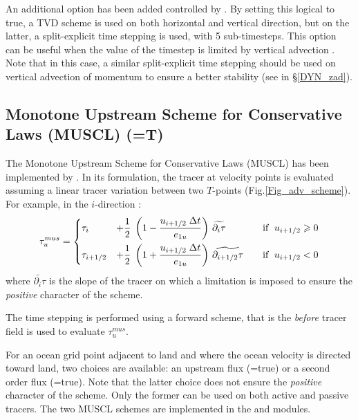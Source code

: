 \documentclass[NEMO_book]{subfiles}
\begin{document}
An additional option has been added controlled by . 
By setting this logical to true, a TVD scheme is used on both horizontal and vertical direction, 
but on the latter, a split-explicit time stepping is used, with 5 sub-timesteps. 
This option can be useful when the value of the timestep is limited by vertical advection \citep{Lemarie_OM2015}. 
Note that in this case, a similar split-explicit time stepping should be used on 
vertical advection of momentum to ensure a better stability (see  in \S\ref{DYN_zad}).


\subsection[MUSCL scheme  (\np{ln\_traadv\_muscl})]
	{Monotone Upstream Scheme for Conservative Laws (MUSCL) (=T)}
\label{TRA_adv_muscl}

The Monotone Upstream Scheme for Conservative Laws (MUSCL) has been 
implemented by \citet{Levy_al_GRL01}. In its formulation, the tracer at velocity points 
is evaluated assuming a linear tracer variation between two $T$-points 
(Fig.\ref{Fig_adv_scheme}). For example, in the $i$-direction :
\begin{equation} \label{Eq_tra_adv_muscl}
   \tau _u^{mus} = \left\{      \begin{aligned}
         &\tau _i  &+ \frac{1}{2} \;\left( 1-\frac{u_{i+1/2} \;\Delta t}{e_{1u}} \right)
         &\ \widetilde{\partial _i \tau}  & \quad \text{if }\;u_{i+1/2} \geqslant 0      \\
         &\tau _{i+1/2} &+\frac{1}{2}\;\left( 1+\frac{u_{i+1/2} \;\Delta t}{e_{1u} } \right)
         &\ \widetilde{\partial_{i+1/2} \tau } & \text{if }\;u_{i+1/2} <0
   \end{aligned}    \right.
\end{equation}
where $\widetilde{\partial _i \tau}$ is the slope of the tracer on which a limitation 
is imposed to ensure the \textit{positive} character of the scheme.

The time stepping is performed using a forward scheme, that is the \textit{before} 
tracer field is used to evaluate $\tau _u^{mus}$.

For an ocean grid point adjacent to land and where the ocean velocity is 
directed toward land, two choices are available: an upstream flux (=true) 
or a second order flux (=true). 
Note that the latter choice does not ensure the \textit{positive} character of the scheme. 
Only the former can be used on both active and passive tracers. 
The two MUSCL schemes are implemented in the  and  modules.
\end{document}
